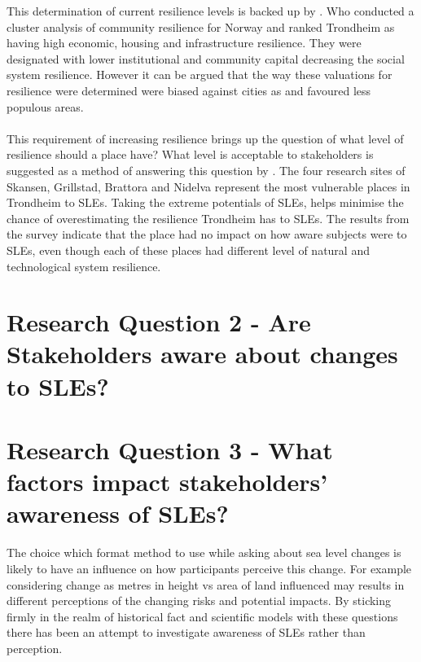 This determination of current resilience levels is backed up by \cite{opach_seeking_2020}. Who conducted a cluster analysis of community resilience for Norway and ranked Trondheim as having high economic, housing and infrastructure resilience. They were designated with lower institutional and community capital decreasing the social system resilience. However it can be argued that the way these valuations for resilience were determined were biased against cities as and favoured less populous areas.

\paragraph{}
This requirement of increasing resilience brings up the question of what level of resilience should a place have? What level is acceptable to stakeholders is suggested as a method of answering this question by \cite{gerkensmeier_governing_2018}. The four research sites of Skansen, Grillstad, Brattora and Nidelva represent the most vulnerable places in Trondheim to SLEs. Taking the extreme potentials of SLEs, helps minimise the chance of overestimating the resilience Trondheim has to SLEs. The results from the survey indicate that the place had no impact on how aware subjects were to SLEs, even though each of these places had different level of natural and technological system resilience. 




\section{Research Question 2 - Are Stakeholders aware about changes to SLEs?}


\section{Research Question 3 - What factors impact stakeholders' awareness of SLEs? }


The choice which format method to use while asking about sea level changes is likely to have an influence on how participants perceive this change. For example considering change as metres in height vs area of land influenced may results in different perceptions of the changing risks and potential impacts.  By sticking firmly in the realm of historical fact and scientific models with these questions there has been an attempt to investigate awareness of SLEs rather than perception. 

